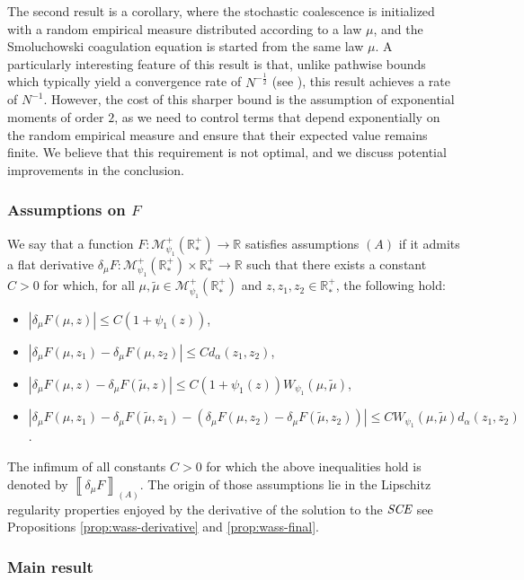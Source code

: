\documentclass[11pt,a4paper]{article}
\newcommand{\RR}{\mathbb{R}}
\newcommand{\RRP}{\mathbb{R}^+_*}
\newcommand{\MC}{\mathcal{M}}
\newcommand{\SCE}{\emph{SCE}}
\newcommand{\A}{(A)}
\begin{document}
The second result is a corollary, where the stochastic coalescence is initialized with a random empirical measure distributed according to a law $\mu$, and the Smoluchowski coagulation equation is started from the same law $\mu$. A particularly interesting feature of this result is that, unlike pathwise bounds which typically yield a convergence rate of $N^{-\frac{1}{2}}$ (see \cite{cepedaSmoluchowskisEquationRate2011a}), this result achieves a rate of $N^{-1}$. However, the cost of this sharper bound is the assumption of exponential moments of order $2$, as we need to control terms that depend exponentially on the random empirical measure and ensure that their expected value remains finite. We believe that this requirement is not optimal, and we discuss potential improvements in the conclusion.
\subsubsection*{Assumptions on $F$}

We say that a function \(F : \MC^+_{\psi_1}(\RRP) \to \RR\) satisfies assumptions \(\A\) if it admits a flat derivative \(\delta_\mu F : \MC^+_{\psi_1}(\RRP) \times \RRP \to \RR\) such that there exists a constant \(C > 0\) for which, for all \(\mu, \tilde{\mu} \in \MC^+_{\psi_1}(\RRP)\) and \(z, z_1, z_2 \in \RRP\), the following hold:
\begin{itemize}
    \item \(|\delta_\mu F(\mu, z)| \leq C(1 + \psi_1(z))\),
    \item \(|\delta_\mu F(\mu, z_1) - \delta_\mu F(\mu, z_2)| \leq C d_\alpha(z_1, z_2)\),
    \item \(|\delta_\mu F(\mu, z) - \delta_\mu F(\tilde{\mu}, z)| \leq C(1 + \psi_1(z)) W_{\psi_1}(\mu, \tilde{\mu})\),
    \item \(|\delta_\mu F(\mu, z_1) - \delta_\mu F(\tilde{\mu}, z_1) - (\delta_\mu F(\mu, z_2) - \delta_\mu F(\tilde{\mu}, z_2))| \leq C W_{\psi_1}(\mu, \tilde{\mu}) d_\alpha(z_1, z_2)\).
\end{itemize}

The infimum of all constants \(C > 0\) for which the above inequalities hold is denoted by \(\left\llbracket \delta_\mu F \right\rrbracket_{\A}\). The origin of those assumptions lie in the Lipschitz regularity properties enjoyed by the derivative of the solution to the $\SCE$ see Propositions \ref{prop:wass-derivative} and \ref{prop:wass-final}.

\subsubsection*{Main result}
\end{document}
